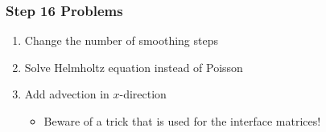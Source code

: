 \begin{frame}
  \frametitle{Step 16 Problems}
  \begin{enumerate}
  \item Change the number of smoothing steps
  \item Solve Helmholtz equation instead of Poisson
  \item Add advection in $x$-direction
    \begin{itemize}
    \item Beware of a trick that is used for the interface matrices!
    \end{itemize}
  \end{enumerate}
\end{frame}
